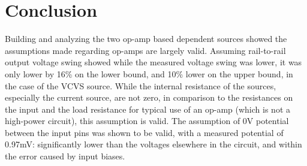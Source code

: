 \section{Conclusion}\label{sec:conclusion}
Building and analyzing the two op-amp based dependent sources showed the assumptions made regarding op-amps are largely valid.
Assuming rail-to-rail output voltage swing showed while the measured voltage swing was lower, it was only lower by 16\% on the lower bound, and 10\% lower on the upper bound, in the case of the VCVS source.
While the internal resistance of the sources, especially the current source, are not zero, in comparison to the resistances on the input and the load resistance for typical use of an op-amp (which is not a high-power circuit), this assumption is valid.
The assumption of 0\si{\volt} potential between the input pins was shown to be valid, with a measured potential of 0.97\si{\milli\volt}: significantly lower than the voltages elsewhere in the circuit, and within the error caused by input biases.
